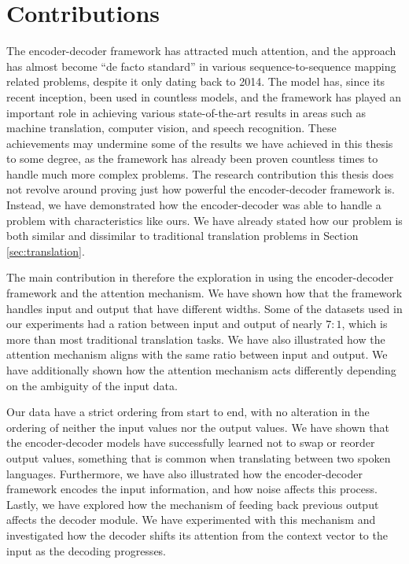 
\section{Contributions}
\label{sec:contributions_final}
The encoder-decoder framework has attracted much attention, and the approach has almost become ``de facto standard'' in various sequence-to-sequence mapping related problems, despite it only dating back to 2014. The model has, since its recent inception, been used in countless models, and the framework has played an important role in achieving various state-of-the-art results in areas such as machine translation, computer vision, and speech recognition. These achievements may undermine some of the results we have achieved in this thesis to some degree, as the framework has already been proven countless times to handle much more complex problems. The research contribution this thesis does not revolve around proving just how powerful the encoder-decoder framework is. Instead, we have demonstrated how the encoder-decoder was able to handle a problem with characteristics like ours. We have already stated how our problem is both similar and dissimilar to traditional translation problems in Section \ref{sec:translation}.

The main contribution in therefore the exploration in using the encoder-decoder framework and the attention mechanism. We have shown how that the framework handles input and output that have different widths. Some of the datasets used in our experiments had a ration between input and output of nearly \(7 : 1\), which is more than most traditional translation tasks. We have also illustrated how the attention mechanism aligns with the same ratio between input and output. We have additionally shown how the attention mechanism acts differently depending on the ambiguity of the input data.

Our data have a strict ordering from start to end, with no alteration in the ordering of neither the input values nor the output values. We have shown that the encoder-decoder models have successfully learned not to swap or reorder output values, something that is common when translating between two spoken languages. Furthermore, we have also illustrated how the encoder-decoder framework encodes the input information, and how noise affects this process. Lastly, we have explored how the mechanism of feeding back previous output affects the decoder module. We have experimented with this mechanism and investigated how the decoder shifts its attention from the context vector to the input as the decoding progresses.

